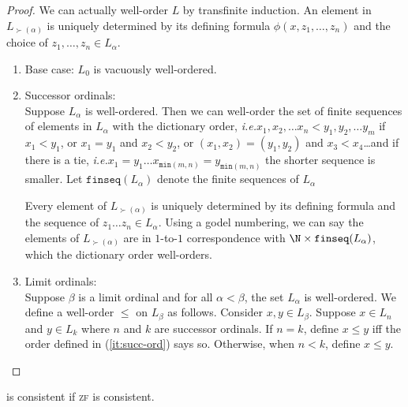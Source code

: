 \documentclass{scrbook}
\newcommand{\ie}{\emph{i.e.}\xspace}
\renewcommand{\min}{\texttt{min}}
\begin{document}
\begin{proof}
  We can actually well-order $L$ by transfinite induction. An element in $L_{\succ(\alpha)}$ is uniquely determined by its defining formula $\phi(x,z_1,\dots,z_n)$ and the choice of $z_1,\dots,z_n\in L_\alpha$.
  \begin{enumerate}
  \item Base case: $L_0$ is vacuously well-ordered. 
  \item Successor ordinals: \label{it:succ-ord}\\
    Suppose $L_\alpha$ is well-ordered. Then we can well-order the set of finite sequences of elements in $L_\alpha$ with the dictionary order, \ie $x_1,x_2,\dots x_n < y_1,y_2, \dots y_m$ if $x_1 < y_1$, or $x_1 = y_1$ and $x_2 < y_2$, or $(x_1,x_2)=(y_1,y_2)$ and $x_3 < x_4$\dots and if there is a tie, \ie $x_1=y_1\dots x_{\min (m,n)}=y_{\min(m,n)}$ the shorter sequence is smaller. Let $\texttt{finseq}(L_\alpha)$ denote the finite sequences of $L_\alpha$ 

    Every element of $L_{\succ(\alpha)}$ is uniquely determined by its defining formula and the sequence of $z_1\dots z_n\in L_\alpha$. Using a godel numbering, we can say the elements of $L_{\succ(\alpha)}$ are in $1$-to-$1$ correspondence with $\N\times \texttt{finseq}(L_\alpha)$, which the dictionary order well-orders. 
  \item Limit ordinals: \\
    Suppose $\beta$ is a limit ordinal and for all $\alpha < \beta$, the set $L_\alpha$ is well-ordered. We define a well-order $\leq$ on $L_\beta$ as follows. Consider $x,y\in L_\beta$. Suppose $x\in L_n$ and $y\in L_k$ where $n$ and $k$ are successor ordinals. If $n=k$, define $x \leq y$ iff the order defined in (\ref{it:succ-ord}) says so. Otherwise, when $n < k$, define $x \leq y$. 
  \end{enumerate}
\end{proof}
\begin{cor}
  \zfc is consistent if \textsc{zf} is consistent.
\end{cor}
\end{document}
